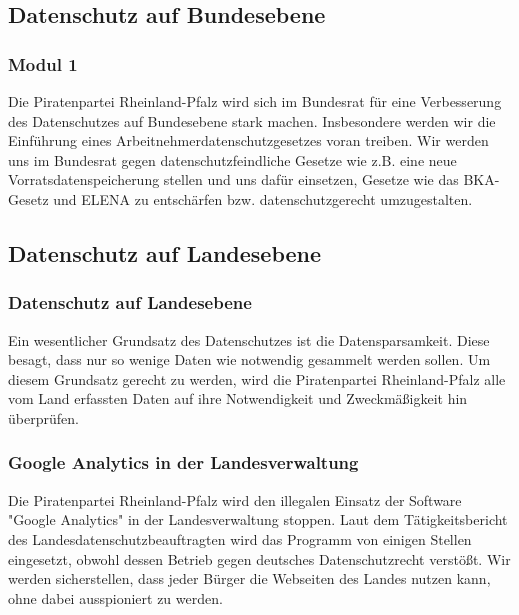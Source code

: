 \subsection*{Datenschutz auf Bundesebene} 
\label{datenschutz:bundesebene}
\subsubsection{Modul 1}
\abstimmung
Die Piratenpartei Rheinland-Pfalz wird sich im Bundesrat für eine Verbesserung des Datenschutzes auf Bundesebene stark machen. Insbesondere werden wir die Einführung eines Arbeitnehmerdatenschutzgesetzes voran treiben. Wir werden uns im Bundesrat gegen datenschutzfeindliche Gesetze wie z.B. eine neue Vorratsdatenspeicherung stellen und uns dafür einsetzen, Gesetze wie das BKA-Gesetz und ELENA zu entschärfen bzw. datenschutzgerecht umzugestalten.

\subsection*{Datenschutz auf Landesebene}
\label{datenschutz:landesebene}
\subsubsection{Datenschutz auf Landesebene}
\abstimmung
Ein wesentlicher Grundsatz des Datenschutzes ist die Datensparsamkeit. Diese besagt, dass nur so wenige Daten wie notwendig gesammelt werden sollen. Um diesem Grundsatz gerecht zu werden, wird die Piratenpartei Rheinland-Pfalz alle vom Land erfassten Daten auf ihre Notwendigkeit und Zweckmäßigkeit hin überprüfen.

\subsubsection{Google Analytics in der Landesverwaltung}
\abstimmung
Die Piratenpartei Rheinland-Pfalz wird den illegalen Einsatz der Software "Google Analytics" in der Landesverwaltung stoppen. Laut dem Tätigkeitsbericht des Landesdatenschutzbeauftragten wird das Programm von einigen Stellen eingesetzt, obwohl dessen Betrieb gegen deutsches Datenschutzrecht verstößt. Wir werden sicherstellen, dass jeder Bürger die Webseiten des Landes nutzen kann, ohne dabei ausspioniert zu werden.

